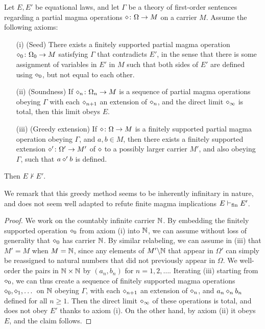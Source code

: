 \begin{theorem}\label{greedy-abstract} Let $E,E'$ be equational laws, and let $\Gamma$ be a theory of first-order sentences regarding a  partial magma operations $\diamond \colon \Omega \to M$ on a carrier $M$.  Assume the following axioms:
\begin{itemize}
  \item[(i)] (Seed) There exists a finitely supported partial magma operation $\diamond_0 \colon \Omega_0 \to M$ satisfying $\Gamma$ that contradicts $E'$, in the sense that there is some assignment of variables in $E'$ in $M$ such that both sides of $E'$ are defined using $\diamond_0$, but not equal to each other.
  \item[(ii)]  (Soundness)  If $\diamond_n \colon \Omega_n \to M$ is a sequence of partial magma operations obeying $\Gamma$ with each $\diamond_{n+1}$ an extension of $\diamond_n$, and the direct limit $\diamond_\infty$ is total, then this limit obeys $E$.
  \item[(iii)] (Greedy extension)  If $\diamond \colon \Omega \to M$ is a finitely supported partial magma operation obeying $\Gamma$, and $a,b \in M$, then there exists a finitely supported extension $\diamond' \colon \Omega' \to M'$ of $\diamond$ to a possibly larger carrier $M'$, and also obeying $\Gamma$, such that $a \diamond' b$ is defined.
\end{itemize}
Then $E \nvdash E'$.
\end{theorem}

We remark that this greedy method seems to be inherently infinitary in nature, and does not seem well adapted to refute finite magma implications $E \vdash_{\mathrm{fin}} E'$.

\begin{proof}  We work on the countably infinite carrier $\mathbb{N}$.  By embedding the finitely supported operation $\diamond_0$ from axiom (i) into $\mathbb{N}$, we can assume without loss of generality that $\diamond_0$ has carrier $\mathbb{N}$.  By similar relabeling, we can assume in (iii) that $M' = M$ when $M=\mathbb{N}$, since any elements of $M' \backslash \mathbb{N}$ that
appear in $\Omega'$ can simply be reassigned to natural numbers that did not previously appear in $\Omega$.  We well-order the pairs in $\mathbb{N} \times \mathbb{N}$ by $(a_n,b_n)$ for $n=1,2,\dots$.  Iterating (iii) starting from $\diamond_0$, we can thus create a sequence of finitely supported magma operations $\diamond_0, \diamond_1, \dots$ on $\mathbb{N}$ obeying $\Gamma$, with each $\diamond_{n+1}$ an extension of $\diamond_n$, and $a_n \diamond_n b_n$ defined for all $n \geq 1$.  Then the direct limit $\diamond_\infty$ of these operations is total, and does not obey $E'$ thanks to axiom (i).  On the other hand, by axiom (ii) it obeys $E$, and the claim follows.
\end{proof}

